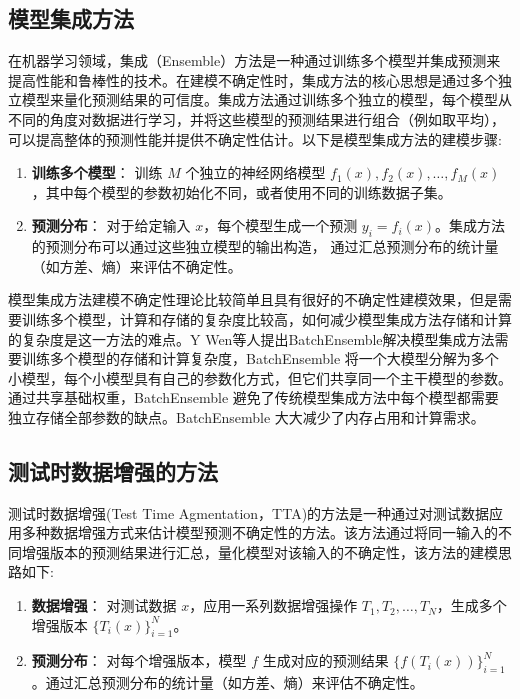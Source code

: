 \subsection{模型集成方法}
在机器学习领域，集成（Ensemble）方法\cite{lakshminarayanan2017simple}\cite{fort2019deep}是一种通过训练多个模型并集成预测来提高性能和鲁棒性的技术。在建模不确定性时，集成方法的核心思想是通过多个独立模型来量化预测结果的可信度。集成方法通过训练多个独立的模型，每个模型从不同的角度对数据进行学习，并将这些模型的预测结果进行组合（例如取平均），可以提高整体的预测性能并提供不确定性估计。以下是模型集成方法的建模步骤:


\begin{enumerate}
    \item \textbf{训练多个模型}：
    训练 \( M \) 个独立的神经网络模型 \( f_1(x), f_2(x), \ldots, f_M(x) \)，其中每个模型的参数初始化不同，或者使用不同的训练数据子集。

    \item \textbf{预测分布}：
    对于给定输入 \( x \)，每个模型生成一个预测 \( y_i = f_i(x) \)。集成方法的预测分布可以通过这些独立模型的输出构造， 通过汇总预测分布的统计量（如方差、熵）来评估不确定性。
\end{enumerate}

模型集成方法建模不确定性理论比较简单且具有很好的不确定性建模效果，但是需要训练多个模型，计算和存储的复杂度比较高，如何减少模型集成方法存储和计算的复杂度是这一方法的难点。Y Wen\cite{wen2020batchensemble}等人提出BatchEnsemble解决模型集成方法需要训练多个模型的存储和计算复杂度，BatchEnsemble 将一个大模型分解为多个小模型，每个小模型具有自己的参数化方式，但它们共享同一个主干模型的参数。通过共享基础权重，BatchEnsemble 避免了传统模型集成方法中每个模型都需要独立存储全部参数的缺点。BatchEnsemble 大大减少了内存占用和计算需求。




\subsection{测试时数据增强的方法}
测试时数据增强(Test Time Agmentation，TTA)的方法是一种通过对测试数据应用多种数据增强方式来估计模型预测不确定性的方法。该方法通过将同一输入的不同增强版本的预测结果进行汇总，量化模型对该输入的不确定性，该方法的建模思路如下:


\begin{enumerate}
    \item \textbf{数据增强}：
    对测试数据 \( x \)，应用一系列数据增强操作 \( T_1, T_2, \ldots, T_N \)，生成多个增强版本 \( \{ T_i(x) \}_{i=1}^N \)。

    \item \textbf{预测分布}：
    对每个增强版本，模型 \( f \) 生成对应的预测结果 \( \{ f(T_i(x)) \}_{i=1}^N \)。通过汇总预测分布的统计量（如方差、熵）来评估不确定性。
\end{enumerate}

